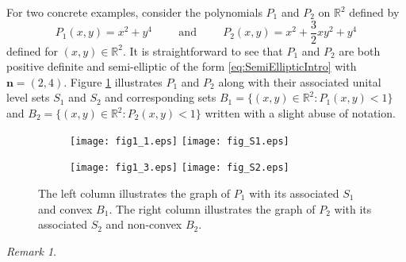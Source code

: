 \documentclass[11pt]{article}
\newenvironment{example}
  {\pushQED{\qed}\renewcommand{\qedsymbol}{$\triangle$}\examplex}
  {\popQED\endexamplex}
\theoremstyle{remark}
\newtheorem{remark}{Remark}
\begin{document}
\begin{example}
\noindent For two concrete examples, consider the polynomials $P_1$ and $P_2$ on $\mathbb{R}^2$ defined by
\begin{equation*}
    P_1(x,y)=x^2+y^4\hspace{1cm}\mbox{and}\hspace{1cm}P_2(x,y)=x^2+\frac{3}{2}xy^2+y^4
\end{equation*}
defined for $(x,y)\in\mathbb{R}^2$. It is straightforward to see that $P_1$ and $P_2$ are both positive definite and semi-elliptic of the form \eqref{eq:SemiEllipticIntro} with $\mathbf{n}=(2,4)$. Figure \ref{fig:PoneAndtwo} illustrates $P_1$ and $P_2$ along with their associated unital level sets $S_1$ and $S_2$ and corresponding sets $B_1=\{(x,y)\in\mathbb{R}^2:P_1(x,y)<1\}$ and $B_2=\{(x,y)\in\mathbb{R}^2:P_2(x,y)<1\}$ written with a slight abuse of notation.
\begin{figure}[!htb]
    \centering
    \hspace{10pt}
    \begin{subfigure}{0.5\textwidth}
    \centering
    \texttt{[image: fig1\_1.eps]}
    \vspace{-10pt}
    \texttt{[image: fig\_S1.eps]}
    \end{subfigure}%
    \hspace{-20pt}
    \begin{subfigure}{0.5\textwidth}
    \centering
    \texttt{[image: fig1\_3.eps]}
    \vspace{-10pt}
    \texttt{[image: fig\_S2.eps]}
    \end{subfigure}
    \caption{The left column illustrates the graph of $P_1$ with its associated $S_1$ and convex $B_1$. The right column illustrates the graph of $P_2$ with its associated $S_2$ and non-convex $B_2$.}
    \label{fig:PoneAndtwo}
\end{figure}
\begin{remark}\label{rmk:PositiveHomogeneousPolynomialsVSFunctions}

\end{remark}
\end{example}
\end{document}
